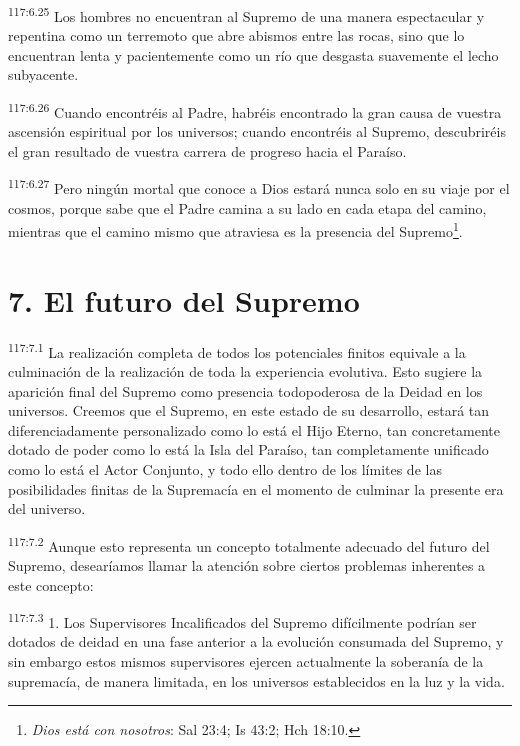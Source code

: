\par
\textsuperscript{117:6.25} Los hombres no encuentran al Supremo de una manera espectacular y repentina como un terremoto que abre abismos entre las rocas, sino que lo encuentran lenta y pacientemente como un río que desgasta suavemente el lecho subyacente.

\par
\textsuperscript{117:6.26} Cuando encontréis al Padre, habréis encontrado la gran causa de vuestra ascensión espiritual por los universos; cuando encontréis al Supremo, descubriréis el gran resultado de vuestra carrera de progreso hacia el Paraíso.

\par
\textsuperscript{117:6.27} Pero ningún mortal que conoce a Dios estará nunca solo en su viaje por el cosmos, porque sabe que el Padre camina a su lado en cada etapa del camino, mientras que el camino mismo que atraviesa es la presencia del Supremo\footnote{\textit{Dios está con nosotros}: Sal 23:4; Is 43:2; Hch 18:10.}.

\section*{7. El futuro del Supremo}
\par
\textsuperscript{117:7.1} La realización completa de todos los potenciales finitos equivale a la culminación de la realización de toda la experiencia evolutiva. Esto sugiere la aparición final del Supremo como presencia todopoderosa de la Deidad en los universos. Creemos que el Supremo, en este estado de su desarrollo, estará tan diferenciadamente personalizado como lo está el Hijo Eterno, tan concretamente dotado de poder como lo está la Isla del Paraíso, tan completamente unificado como lo está el Actor Conjunto, y todo ello dentro de los límites de las posibilidades finitas de la Supremacía en el momento de culminar la presente era del universo.

\par
\textsuperscript{117:7.2} Aunque esto representa un concepto totalmente adecuado del futuro del Supremo, desearíamos llamar la atención sobre ciertos problemas inherentes a este concepto:

\par
\textsuperscript{117:7.3} 1. Los Supervisores Incalificados del Supremo difícilmente podrían ser dotados de deidad en una fase anterior a la evolución consumada del Supremo, y sin embargo estos mismos supervisores ejercen actualmente la soberanía de la supremacía, de manera limitada, en los universos establecidos en la luz y la vida.

